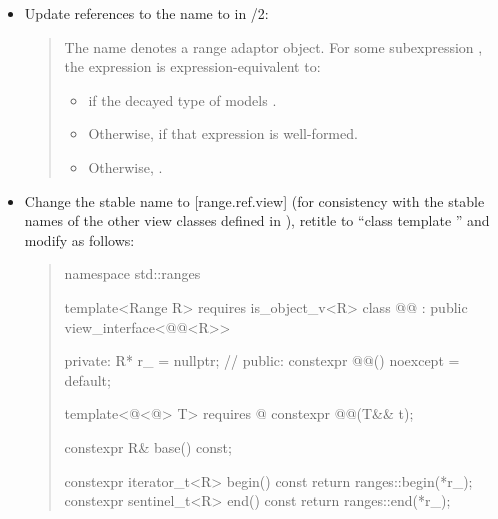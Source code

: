 \begin{itemize}
\item Update references to the name  to
   in /2:
  \begin{quote}
\setcounter{Paras}{1}
\pnum
The name  denotes a range adaptor
object. For some subexpression ,
the expression  is expression-equivalent to:

\begin{itemize}
\item {} if the decayed type of 
models .

\item Otherwise,
 if that
expression is well-formed.

\item Otherwise, .
\end{itemize}

  \end{quote}
\item Change the stable name  to [range.ref.view] (for consistency with the stable names of the other view classes defined in ), retitle to ``class template '' and modify as
  follows:
  \begin{quote}
\setcounter{Paras}{0}
\pnum
{}

\begin{codeblock}
namespace std::ranges {
  template<Range R>
    requires is_object_v<R>
  class @@ : public view_interface<@@<R>> {
  private:
    R* r_ = nullptr; // \expos
  public:
    constexpr @@() noexcept = default;

    template<@<@> T>
      requires @\seebelow@
    constexpr @@(T&& t);

    constexpr R& base() const;

    constexpr iterator_t<R> begin() const { return ranges::begin(*r_); }
    constexpr sentinel_t<R> end() const { return ranges::end(*r_); }

}}
\end{codeblock}
\end{quote}
\end{itemize}
